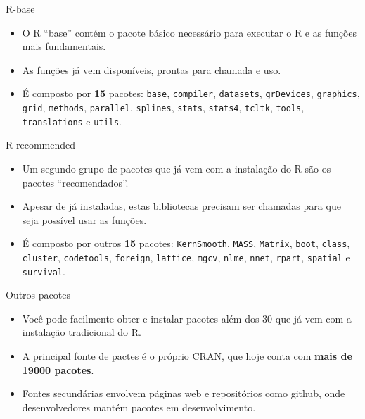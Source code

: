 \documentclass[
  ignorenonframetext,
  serif,
  professionalfont,
  usenames,
  dvipsnames,
  aspectratio = 169]{beamer}
\def\beginAHalfColumn{\begin{minipage}{0.49\textwidth}}%
\def\endColumns{\end{minipage}}%
\begin{document}
\begin{frame}[fragile]{R-base}
\protect\hypertarget{r-base}{}
\beginAHalfColumn

\begin{itemize}
\item
  O R ``base'' contém o pacote básico necessário para executar o R e as
  funções mais fundamentais.
\item
  As funções já vem disponíveis, prontas para chamada e uso.
\item
  É composto por \textbf{15} pacotes: \texttt{base}, \texttt{compiler},
  \texttt{datasets}, \texttt{grDevices}, \texttt{graphics},
  \texttt{grid}, \texttt{methods}, \texttt{parallel}, \texttt{splines},
  \texttt{stats}, \texttt{stats4}, \texttt{tcltk}, \texttt{tools},
  \texttt{translations} e \texttt{utils}.
\end{itemize}

\endColumns
\beginAHalfColumn

\endColumns
\end{frame}

\begin{frame}[fragile]{R-recommended}
\protect\hypertarget{r-recommended}{}
\beginAHalfColumn

\begin{itemize}
\item
  Um segundo grupo de pacotes que já vem com a instalação do R são os
  pacotes ``recomendados''.
\item
  Apesar de já instaladas, estas bibliotecas precisam ser chamadas para
  que seja possível usar as funções.
\item
  É composto por outros \textbf{15} pacotes: \texttt{KernSmooth},
  \texttt{MASS}, \texttt{Matrix}, \texttt{boot}, \texttt{class},
  \texttt{cluster}, \texttt{codetools}, \texttt{foreign},
  \texttt{lattice}, \texttt{mgcv}, \texttt{nlme}, \texttt{nnet},
  \texttt{rpart}, \texttt{spatial} e \texttt{survival}.
\end{itemize}

\endColumns
\beginAHalfColumn

\endColumns
\end{frame}

\begin{frame}{Outros pacotes}
\protect\hypertarget{outros-pacotes}{}
\beginAHalfColumn

\begin{itemize}
\item
  Você pode facilmente obter e instalar pacotes além dos 30 que já vem
  com a instalação tradicional do R.
\item
  A principal fonte de pactes é o próprio CRAN, que hoje conta com
  \textbf{mais de 19000 pacotes}.
\item
  Fontes secundárias envolvem páginas web e repositórios como github,
  onde desenvolvedores mantém pacotes em desenvolvimento.
\end{itemize}

\endColumns
\beginAHalfColumn

\endColumns
\end{frame}
\end{document}
